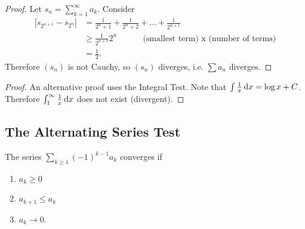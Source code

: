 \begin{proof}
  Let $s_n = \sum_{k=1}^\infty a_k$. Consider
  \begin{align*}
    |s_{2^{n + 1}} - s_{2^n}|
    &= \frac{1}{2^n + 1} + \frac{1}{2^n + 2} + \ldots + \frac{1}{2^{n+1}}\\
    &\geq \frac{1}{2^{n+1}}2^n ~~~~~~~~~~~~~~\text{(smallest term) x (number of terms)}\\
    &= \frac{1}{2}.
  \end{align*}
  Therefore $(s_n)$ is not Cauchy, so $(s_n)$ diverges, i.e. $\sum a_n$ diverges.
\end{proof}

\begin{proof}
  An alternative proof uses the Integral Test. Note that $\int \frac{1}{x} \dx = \log x +
  C$. Therefore $\int_1^\infty \frac{1}{x} \dx$ does not exist (divergent). 
\end{proof}


\subsection{The Alternating Series Test}
\begin{theorem}
  The series $\sum_{k\geq 1}(-1)^{k-1}a_k$ converges if
  \begin{enumerate}[label=(\roman*)]
  \item $a_k \geq 0$
  \item $a_{k+1} \leq a_k$
  \item $a_k \to 0$.
  \end{enumerate}
\end{theorem}

